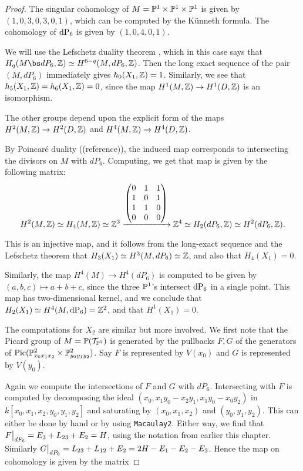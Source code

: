 \begin{proof}
The singular cohomology of $M=\P^1 \times \P^1 \times \P^1$ is given by $(1,0,3,0,3,0,1)$, which can be computed by the Künneth formula. The cohomology of $\dP6$ is given by $(1,0,4,0,1)$.

We will use the Lefschetz duality theorem \cite{spanier_topology}, which in this case says that $H_q(M \bs dP_6, \Z) \simeq H^{6-q}(M,dP_6,\Z)$. Then the long exact sequence of the pair $(M,dP_6)$ immediately gives $h_0(X_1,\Z)=1$. Similarly, we see that $h_5(X_1,\Z)=h_6(X_1,\Z)=0$, since the map $H^1(M,\Z) \to H^1(D,\Z)$ is an isomorphism.

The other groups depend upon the explicit form of the maps $H^2(M,\Z) \to H^2(D,\Z)$ and $H^4(M,\Z) \to H^4(D,\Z)$.

By Poincaré duality ((reference)), the induced map corresponds to intersecting the divisors on $M$ with $dP_6$. Computing, we get that map is given by the following matrix:
\[
H^2(M,\Z) \simeq H_4(M,\Z) \simeq \Z^3 \xrightarrow{
	\begin{pmatrix}
	0 & 1 & 1 \\
	1 & 0 & 1 \\
	1 & 1 & 0 \\
	0 & 0 & 0
	\end{pmatrix}
} \Z^4 \simeq H_2(dP_6,\Z) \simeq H^2(dP_6,\Z).
\]

This is an injective map, and it follows from the long-exact sequence and the Lefschetz theorem that $H_3(X_1) \simeq H^3(M,dP_6) \simeq \Z$, and also that $H_4(X_1)=0$.

Similarly, the map $H^4(M) \to H^4(dP_6)$ is computed to be given by $(a,b,c) \mapsto a+b+c$, since the three $\P^1$'s intersect $\dP6$ in a single point. This map has two-dimensional kernel, and we conclude that $H_2(X_1) \simeq H^4(M,\dP6) = \Z^2$, and that $H^1(X_1)=0$.

The computations for $X_2$ are similar but more involved. We first note that the Picard group of $M=\P(\mathcal T_{\P^2})$ is generated by the pullbacks $F,G$ of the generators of $\Pic(\P^2_{x_0x_1x_2} \times \P^2_{y_0y_1y_2})$. Say $F$ is represented by $V(x_0)$ and $G$ is represented by $V(y_0)$.

Again we compute the intersections of $F$ and $G$ with $dP_6$. Intersecting with $F$ is computed by decomposing the ideal $(x_0,x_1y_0-x_2y_1,x_1y_0-x_0y_2)$ in $k[x_0,x_1,x_2,y_0,y_1,y_2]$ and saturating by $(x_0,x_1,x_2)$ and $(y_0,y_1,y_2)$. This can either be done by hand or by using \texttt{Macaulay2}. Either way, we find that $\restr{F}{dP_6} = E_3+L_{23} + E_2=H$, using the notation from earlier this chapter. Similarly $\restr{G}{dP_6}=L_{23}+L_{12}+E_2=2H-E_1-E_2-E_3$. Hence the map on cohomology is given by the matrix


\end{proof}

